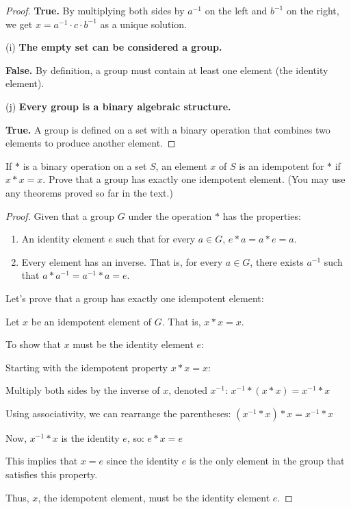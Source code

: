 \documentclass[12pt]{amsart}
\theoremstyle{definition}
\numberwithin{equation}{section}
\theoremstyle{plain}
\begin{document}
\begin{exercise}{25}
\begin{proof}
\textbf{True.} By multiplying both sides by \(a^{-1}\) on the left and \(b^{-1}\) on the right, we get \(x = a^{-1} \cdot c \cdot b^{-1}\) as a unique solution.

(i) \textbf{The empty set can be considered a group.} 

\textbf{False.} By definition, a group must contain at least one element (the identity element).

(j) \textbf{Every group is a binary algebraic structure.}

\textbf{True.} A group is defined on a set with a binary operation that combines two elements to produce another element.
    \end{proof}
    \end{exercise}
    \begin{exercise}{31}
        If $*$ is a binary operation on a set $S$, an element $x$ of $S$ is an idempotent for $*$ if $x * x = x$. Prove that a group
        has exactly one idempotent element. (You may use any theorems proved so far in the text.)
    \begin{proof}
Given that a group \( G \) under the operation \( * \) has the properties:
\begin{enumerate}
    \item An identity element \( e \) such that for every \( a \in G \), \( e * a = a * e = a \).
    \item Every element has an inverse. That is, for every \( a \in G \), there exists \( a^{-1} \) such that \( a * a^{-1} = a^{-1} * a = e \).
\end{enumerate}
Let's prove that a group has exactly one idempotent element:

Let \( x \) be an idempotent element of \( G \). That is, \( x * x = x \).

To show that \( x \) must be the identity element \( e \):

Starting with the idempotent property \( x * x = x \):

Multiply both sides by the inverse of \( x \), denoted \( x^{-1} \):
\( x^{-1} * (x * x) = x^{-1} * x \)

Using associativity, we can rearrange the parentheses:
\( (x^{-1} * x) * x = x^{-1} * x \)

Now, \( x^{-1} * x \) is the identity \( e \), so:
\( e * x = e \)

This implies that \( x = e \) since the identity \( e \) is the only element in the group that satisfies this property.

Thus, \( x \), the idempotent element, must be the identity element \( e \).


\end{proof}
\end{exercise}
\end{document}
